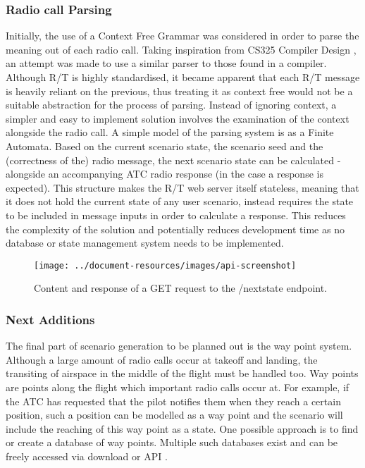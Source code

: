 \subsubsection{Radio call Parsing}
Initially, the use of a Context Free Grammar was considered in order to parse the meaning out of each radio call. Taking inspiration from CS325 Compiler Design \cite{CS325}, an attempt was made to use a similar parser to those found in a compiler. Although R/T is highly standardised, it became apparent that each R/T message is heavily reliant on the previous, thus treating it as context free would not be a suitable abstraction for the process of parsing. Instead of ignoring context, a simpler and easy to implement solution involves the examination of the context alongside the radio call. A simple model of the parsing system is as a Finite Automata. Based on the current scenario state, the scenario seed and the (correctness of the) radio message, the next scenario state can be calculated - alongside an accompanying ATC radio response (in the case a response is expected). This structure makes the R/T web server itself stateless, meaning that it does not hold the current state of any user scenario, instead requires the state to be included in message inputs in order to calculate a response. This reduces the complexity of the solution and potentially reduces development time as no database or state management system needs to be implemented.

\begin{figure}[H]
    \centering
	\texttt{[image: ../document-resources/images/api-screenshot]}
    \label{api-endpoint}
    \caption{Content and response of a GET request to the /nextstate endpoint.}
\end{figure}

\subsubsection{Next Additions}
The final part of scenario generation to be planned out is the way point system. Although a large amount of radio calls occur at takeoff and landing, the transiting of airspace in the middle of the flight must be handled too. Way points are points along the flight which important radio calls occur at. For example, if the ATC has requested that the pilot notifies them when they reach a certain position, such a position can be modelled as a way point and the scenario will include the reaching of this way point as a state. One possible approach is to find or create a database of way points. Multiple such databases exist and can be freely accessed via download or API \cite{Google-maps-waypoints, Opennav-database}.